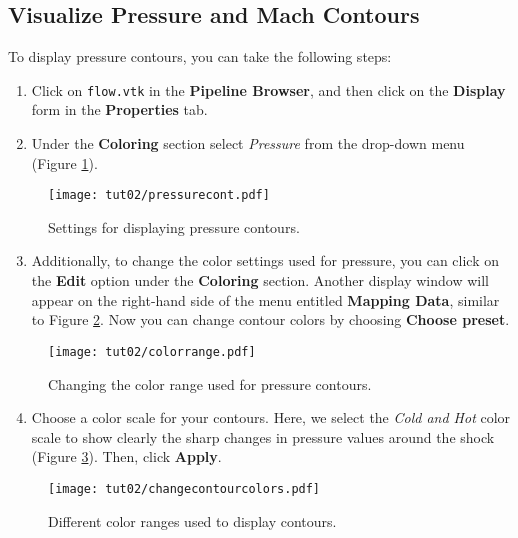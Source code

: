 \subsection{Visualize Pressure and Mach Contours}
To display pressure contours, you can take the following steps:
\begin{enumerate}[label=\arabic*)]
	\item Click on \texttt{flow.vtk} in the \textbf{Pipeline Browser}, and then click on the \textbf{Display} form in the \textbf{Properties} tab.
	\item Under the \textbf{Coloring} section select \textit{Pressure} from the drop-down menu (Figure \ref{fig2:pressure contours setting}).
\end{enumerate}
\begin{figure}[H]
	\centering
	\texttt{[image: tut02/pressurecont.pdf]}
	\caption{Settings for displaying pressure contours.}
	\label{fig2:pressure contours setting}
\end{figure} 
\begin{enumerate}[label=\arabic*)]
	\setcounter{enumi}{2}
	\item Additionally, to change the color settings used for pressure, you can click on the \textbf{Edit} option under the \textbf{Coloring} section. Another display window will appear on the right-hand side of the menu entitled \textbf{Mapping Data}, similar to Figure \ref{fig2:color_range}. Now you can change contour colors by choosing \textbf{Choose preset}.
\end{enumerate}  
\begin{figure}[ht]
    \centering
    \texttt{[image: tut02/colorrange.pdf]}
    \caption{Changing the color range used for pressure contours.}
    \label{fig2:color_range}
\end{figure}
\begin{enumerate}[label=\arabic*)]
	\setcounter{enumi}{3}
	\item Choose a color scale for your contours. Here, we select the \textit{Cold and Hot} color scale to show clearly the sharp changes in pressure values around the shock (Figure \ref{fig2:color_range_item}). Then, click \textbf{Apply}.
\end{enumerate}  
\begin{figure}[ht]
    \centering
    \texttt{[image: tut02/changecontourcolors.pdf]}
    \caption{Different color ranges used to display contours.}
    \label{fig2:color_range_item}
\end{figure}

